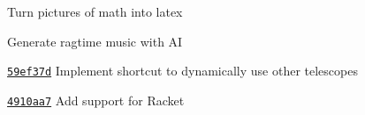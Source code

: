 

{}

Turn pictures of math into latex

\smalldivider

Generate ragtime music with AI

\smallskip




\href{https://github.com/nvim-lua/telescope.nvim/commit/59ef37ded43a77a4c0f35be434f1ea72a407ce84}{\texttt{59ef37d}} 
Implement shortcut to dynamically use other telescopes

\smalldivider

\href{https://github.com/ujihisa/repl.vim/commit/4910aa7d7b0c7abda92dcfdb4cde030fb839091d}{\texttt{4910aa7}} 
Add support for Racket

\smallskip
{}

\smallskip
{}

